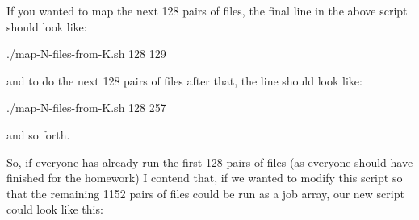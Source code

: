 \documentclass[]{krantz}
\makeatletter
\newenvironment{Shaded}{\begin{snugshade}}{\end{snugshade}}
\newcommand{\CommentTok}[1]{\textcolor[rgb]{0.37,0.37,0.37}{\textit{#1}}}
\newcommand{\ExtensionTok}[1]{#1}
\newcommand{\NormalTok}[1]{#1}
\newcommand{\VariableTok}[1]{\textcolor[rgb]{0,0,0}{#1}}
\newenvironment{kframe}{%
\medskip{}
\setlength{\fboxsep}{.8em}
 \def\at@end@of@kframe{}%
 \ifinner\ifhmode%
  \def\at@end@of@kframe{\end{minipage}}%
  \begin{minipage}{\columnwidth}%
 \fi\fi%
 \def\FrameCommand##1{\hskip\@totalleftmargin \hskip-\fboxsep
 \colorbox{shadecolor}{##1}\hskip-\fboxsep
     \hskip-\linewidth \hskip-\@totalleftmargin \hskip\columnwidth}%
 \MakeFramed {\advance\hsize-\width
   \@totalleftmargin\z@ \linewidth\hsize
   \@setminipage}}%
 {\par\unskip\endMakeFramed%
 \at@end@of@kframe}
\renewenvironment{Shaded}{\begin{kframe}}{\end{kframe}}
\makeatother
\begin{document}
\begin{Shaded}
\end{Shaded}

If you wanted to map the next 128 pairs of files, the final line in the above
script should look like:

\begin{Shaded}
\begin{Highlighting}[]
\ExtensionTok{./map-N-files-from-K.sh}\NormalTok{ 128 129}
\end{Highlighting}
\end{Shaded}

and to do the next 128 pairs of files after that, the line should look like:

\begin{Shaded}
\begin{Highlighting}[]
\ExtensionTok{./map-N-files-from-K.sh}\NormalTok{ 128 257}
\end{Highlighting}
\end{Shaded}

and so forth.

So, if everyone has already run the first 128 pairs of files (as everyone should
have finished for the homework) I contend that, if we wanted to modify this script
so that the remaining 1152 pairs of files could be run as a job array, our new script
could look like this:

\begin{Shaded}
\end{Shaded}
\end{document}
